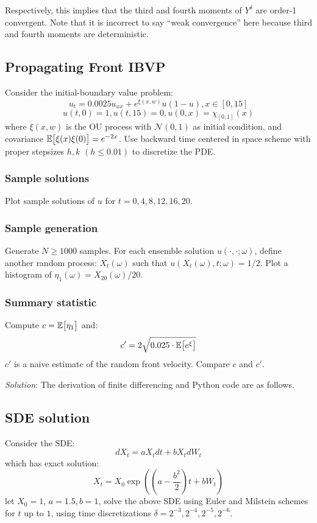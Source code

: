 \documentclass{article}
\begin{document}
Respectively, this implies that the third and fourth moments of $Y^{\delta}$ are order-1 convergent. Note that it is incorrect to say ``weak convergence'' here because third and fourth moments are deterministic.


\subsection{Propagating Front IBVP} Consider the initial-boundary value problem:
$$
    u_t = 0.0025u_{xx} + e^{\xi(x,w)}u(1-u), x\in[0,15]
$$
$$
    u(t,0) = 1, u(t,15) = 0, u(0,x) = \chi_{[0,1]}(x)
$$ where $\xi(x,w)$ is the OU process with $\mathcal{N}(0,1)$ as initial condition, and covariance $\mathbb{E}\big[ {\xi(x)\xi(0)} \big]=e^{-2x}$. Use backward time centered in space scheme with proper stepsizes $h, k$ $(h\le 0.01)$ to discretize the PDE. 





\subsubsection{Sample solutions} Plot sample solutions of $u$ for $t=0,4,8,12,16,20$. 

\subsubsection{Sample generation} Generate $N\ge 1000$ samples. For each ensemble solution $u(\cdot , \cdot ; \omega)$, define another random process:
$X_t(\omega)$ such that $u(X_t(\omega),t;\omega) = 1/2$. Plot a histogram of $\eta_1(\omega) = X_{20}(\omega)/20$.

\subsubsection{Summary statistic} Compute $c = \mathbb{E}\big[ {\eta_1} \big]$ and:
$$
    c' = 2\sqrt{0.025 \cdot \mathbb{E}\big[ {e^{\xi}} \big]}
$$ $c'$ is a naive estimate of the random front velocity. Compare $c$ and $c'$.

\emph{Solution}: The derivation of finite differencing and Python code are as follows.



\subsection{SDE solution} Consider the SDE:
$$
    dX_t = aX_tdt + bX_tdW_t
$$ which has exact solution:
$$
    X_t = X_0\exp((a-\frac{b^2}{2})t+bW_t)
$$ let $X_0=1$, $a=1.5,b=1$, solve the above SDE using Euler and Milstein schemes for $t$ up to $1$, using time discretizations $\delta = 2^{-3}, 2^{-4}, 2^{-5}, 2^{-6}$.
\end{document}

